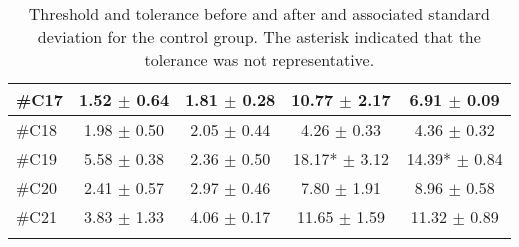 \begin{longtable} {l|c|c|c|c}
\#C17 & 1.52 $\pm$ 0.64 & 1.81 $\pm$ 0.28  & 10.77 $\pm$ 2.17 & 6.91 $\pm$ 0.09 \\ \hline
\#C18 & 1.98  $\pm$ 0.50 & 2.05 $\pm$ 0.44 & 4.26  $\pm$ 0.33 &  4.36 $\pm$  0.32 \\ \hline
\#C19 & 5.58  $\pm$ 0.38 & 2.36 $\pm$ 0.50 & 18.17* $\pm$ 3.12 & 14.39* $\pm$ 0.84 \\ \hline
\#C20 & 2.41 $\pm$  0.57 & 2.97 $\pm$ 0.46  & 7.80 $\pm$ 1.91  &  8.96 $\pm$ 0.58 \\ \hline
\#C21 & 3.83 $\pm$ 1.33 & 4.06 $\pm$  0.17 & 11.65 $\pm$ 1.59  & 11.32 $\pm$ 0.89 \\ \hline
	\caption{Threshold and tolerance before and after and associated standard deviation for the control group. The asterisk indicated that the tolerance was not representative.}
	\label{tab:ControlA}
\end{longtable}